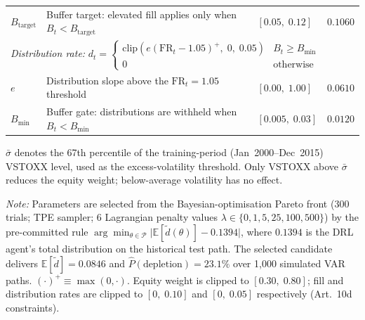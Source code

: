 \begin{table}[H]
\begin{threeparttable}
\begin{tabular}{l
    >{\raggedright\arraybackslash}p{5.2cm}
    >{\centering\arraybackslash}p{2.0cm}
    >{\centering\arraybackslash}p{2.0cm}}
$B_{\mathrm{target}}$
  & Buffer target: elevated fill applies only when $B_t < B_{\mathrm{target}}$
  & $[0.05,\;0.12]$
  & $0.1060$ \\[6pt]

\multicolumn{4}{l}{%
  \textit{Distribution rate:\quad}
  $d_t =
    \begin{cases}
      \mathrm{clip}(e(\mathrm{FR}_t - 1.05)^{+},\;0,\;0.05) & B_t \geq B_{\min} \\
      0 & \text{otherwise}
    \end{cases}$} \\[3pt]

$e$
  & Distribution slope above the $\mathrm{FR}_t = 1.05$ threshold
  & $[0.00,\;1.00]$
  & $0.0610$ \\

$B_{\min}$
  & Buffer gate: distributions are withheld when $B_t < B_{\min}$
  & $[0.005,\;0.03]$
  & $0.0120$ \\

\bottomrule
\end{tabular}
\begin{tablenotes}
  \footnotesize
  \item[a] $\bar{\sigma}$ denotes the 67th percentile of the training-period
    (Jan~2000--Dec~2015) VSTOXX level, used as the excess-volatility
    threshold.  Only VSTOXX above $\bar{\sigma}$ reduces the equity weight;
    below-average volatility has no effect.
  \item \textit{Note:} Parameters are selected from the Bayesian-optimisation
    Pareto front (300 trials; TPE sampler; 6 Lagrangian penalty values
    $\lambda \in \{0,1,5,25,100,500\}$) by the pre-committed rule
    $\arg\min_{\theta \in \mathcal{P}} \lvert
    \mathbb{E}[\tilde{d}(\theta)] - 0.1394 \rvert$,
    where $0.1394$ is the DRL agent's total distribution on the historical
    test path.  The selected candidate delivers
    $\mathbb{E}[\tilde{d}] = 0.0846$ and $\hat{P}(\text{depletion}) = 23.1\%$
    over 1{,}000 simulated VAR paths.
    $(\cdot)^{+} \equiv \max(0, \cdot)$.  Equity weight is clipped to
    $[0.30,\;0.80]$; fill and distribution rates are clipped to $[0,\;0.10]$
    and $[0,\;0.05]$ respectively (Art.~10d constraints).
\end{tablenotes}
\end{threeparttable}
\end{table}
